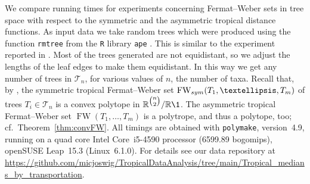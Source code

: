 \documentclass[a4paper,12pt]{amsart}
\newcommand\RR{{\mathbb R}}
\newcommand\cT{{\mathcal T}}
\newcommand\torus[1]{\RR^{#1}/\RR\1} %
\DeclareMathOperator{\FW}{FW} %
\newcommand{\FWsym}{\FW_{\rm sym}} %
\theoremstyle{remark}
\newcommand\polymake{\texttt{polymake}\xspace}
\begin{document}
We compare running times for experiments concerning Fermat--Weber sets in tree space with respect to the symmetric and the asymmetric tropical distance functions.
As input data we take random trees which were produced using the function \texttt{rmtree} from the \texttt{R} library \texttt{ape} \cite{ape-software}.
This is similar to the experiment reported in \cite[Example 8]{YoshidaZhangZhang:2019}.
Most of the trees generated are not equidistant, so we adjust the lengths of the leaf edges to make them equidistant.
In this way we get any number of trees in $\cT_n$, for various values of $n$, the number of taxa.
Recall that, by \cite[Proposition 26]{ConvTreeSp}, the symmetric tropical Fermat--Weber set $\FWsym(T_1,\dots,T_m)$ of trees $T_i\in\cT_n$ is a convex polytope in $\torus{\tbinom{n}{2}}$.
The asymmetric tropical Fermat--Weber set $\FW(T_1,\dots,T_m)$ is a polytrope, and thus a polytope, too; cf.\ Theorem~\ref{thm:convFW}.
All timings are obtained with \polymake, version~4.9, running on a quad core Intel Core~i5-4590 processor (6599.89 bogomips), openSUSE Leap~15.3 (Linux~6.1.0).
For details see our data repository at \url{https://github.com/micjoswig/TropicalDataAnalysis/tree/main/Tropical_medians_by_transportation}.
\end{document}
